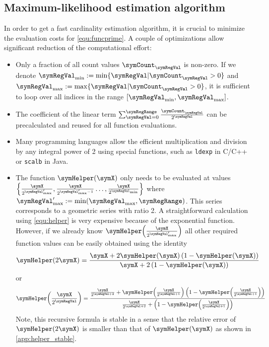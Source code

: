 \documentclass[a4paper]{scrartcl}
\begin{document}
\subsection{Maximum-likelihood estimation algorithm}
In order to get a fast cardinality estimation algorithm, it is crucial to minimize the evaluation costs for \eqref{equ:funcprime}. A couple of optimizations allow significant reduction of the computational effort:
\begin{itemize}
\item Only a fraction of all count values $\symCount_\symRegVal$ is non-zero. If we denote $\symRegVal_\text{min}:=\min\lbrace \symRegVal\vert\symCount_\symRegVal>0\rbrace$ and $\symRegVal_\text{max}:=\max\lbrace \symRegVal\vert\symCount_\symRegVal>0\rbrace$,  it is sufficient to loop over all indices in the range $[\symRegVal_\text{min}, \symRegVal_\text{max}]$.
\item The coefficient of the linear term $\sum_{\symRegVal=0}^\symRegRange \frac{\symCount_\symRegVal}{2^\symRegVal}$ can be precalculated and reused for all function evaluations.
\item Many programming languages allow the efficient multiplication and division by any integral power of 2 using special functions, such as \texttt{ldexp} in C/C++ or \texttt{scalb} in Java.
\item The function $\symHelper(\symX)$ only needs to be evaluated at values $\left\lbrace\frac{\symX}{2^{\symRegVal'_\text{max}}},\frac{\symX}{2^{\symRegVal'_\text{max}-1}}\ldots,\frac{\symX}{2^{\symRegVal_\text{min}}}\right\rbrace$ where $\symRegVal'_\text{max} := \min(\symRegVal_\text{max}, \symRegRange)$. This series corresponds to a geometric series with ratio 2. A straightforward calculation using \eqref{equ:helper} is very expensive because of the exponential function. However, if we already know $\symHelper\!\left(\frac{\symX}{2^{\symRegVal'_\text{max}}}\right)$ all other required function values can be easily obtained using the identity
\begin{equation}
\label{equ:helper_recursion1}
\symHelper\!\left(2\symX\right) = \frac{\symX+2\symHelper\!\left(\symX\right)\left(1-\symHelper\!\left(\symX\right)\right)}{\symX+2\left(1-\symHelper\!\left(\symX\right)\right)}
\end{equation}
or
\begin{equation}
\label{equ:helper_recursion2}
\symHelper\!\left(\frac{\symX}{2^{\symRegVal}}\right) = \frac{\frac{\symX}{2^{\symRegVal+2}}+\symHelper\!\left(\frac{\symX}{2^{\symRegVal+1}}\right)\left(1-\symHelper\!\left(\frac{\symX}{2^{\symRegVal+1}}\right)\right)}{\frac{\symX}{2^{\symRegVal+2}}+\left(1-\symHelper\!\left(\frac{\symX}{2^{\symRegVal+1}}\right)\right)}
\end{equation}
Note, this recursive formula is stable in a sense that the relative error of $\symHelper\!\left(2\symX\right)$ is smaller than that of $\symHelper\!\left(\symX\right)$ as shown in \cref{app:helper_stable}.


\end{itemize}
\end{document}
